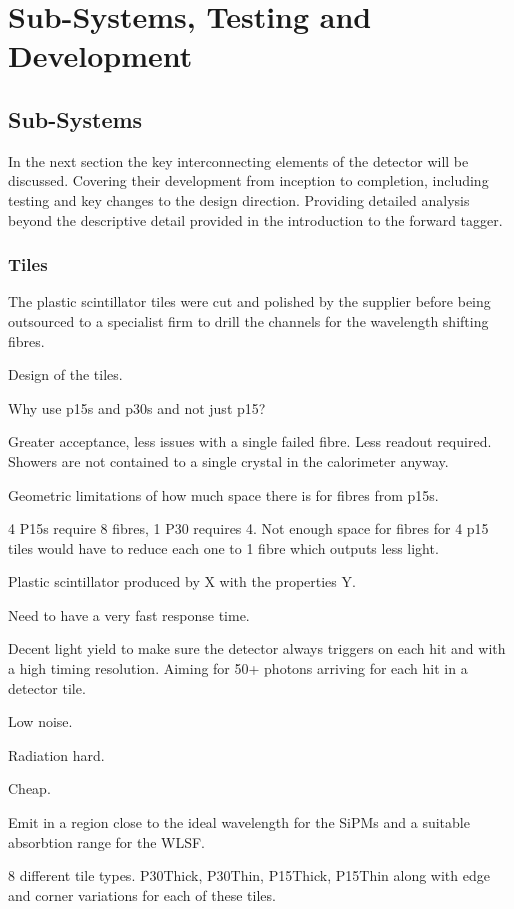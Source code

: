 \chapter{Sub-Systems, Testing and Development}

\section{Sub-Systems}
In the next section the key interconnecting elements of the detector will be discussed. Covering their development from inception to completion, including testing and key changes to the design direction. Providing detailed analysis beyond the descriptive detail provided in the introduction to the forward tagger.


\subsection{Tiles}

The plastic scintillator tiles were cut and polished by the supplier before being outsourced to a specialist firm to drill the channels for the wavelength shifting fibres.

Design of the tiles.

Why use p15s and p30s and not just p15?

Greater acceptance, less issues with a single failed fibre. Less readout required.
Showers are not contained to a single crystal in the calorimeter anyway.

Geometric limitations of how much space there is for fibres from p15s.

4 P15s require 8 fibres, 1 P30 requires 4. Not enough space for fibres for 4 p15 tiles would have to reduce each one to 1 fibre which outputs less light.

Plastic scintillator produced by X with the properties Y.

Need to have a very fast response time.

Decent light yield to make sure the detector always triggers on each hit and with a high timing resolution. Aiming for 50+ photons arriving for each hit in a detector tile.

Low noise.

Radiation hard.

Cheap.

Emit in a region close to the ideal wavelength for the SiPMs and a suitable absorbtion range for the WLSF.

8 different tile types. P30Thick, P30Thin, P15Thick, P15Thin along with edge and corner variations for each of these tiles.

